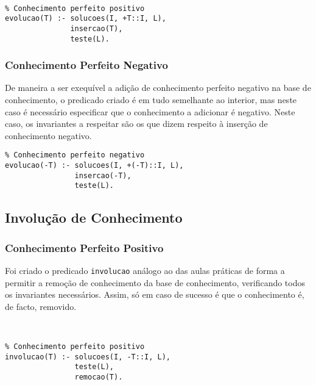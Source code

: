 \

\begin{lstlisting}[caption={Evolução de Conhecimento Perfeito Positivo}]
% Extensao do meta-predicado evolucao: T -> {V, F}
% Conhecimento perfeito positivo
evolucao(T) :- solucoes(I, +T::I, L),
               insercao(T),
               teste(L).
\end{lstlisting}

\subsubsection{Conhecimento Perfeito Negativo}

De maneira a ser exequível a adição de conhecimento perfeito negativo na
base de conhecimento, o predicado criado é em tudo semelhante ao interior, mas neste caso
é necessário especificar que o conhecimento a adicionar é negativo. Neste caso,
os invariantes a respeitar são os que dizem respeito à inserção de conhecimento
negativo.

\pagebreak

\begin{lstlisting}[caption={Evolução de Conhecimento Perfeito Negativo}]
% Extensao do meta-predicado evolucao: T -> {V, F}
% Conhecimento perfeito negativo
evolucao(-T) :- solucoes(I, +(-T)::I, L),
                insercao(-T),
                teste(L).
\end{lstlisting}

\subsection{Involução de Conhecimento}

\subsubsection{Conhecimento Perfeito Positivo}

Foi criado o predicado \texttt{involucao} análogo ao das aulas práticas de forma a permitir a 
remoção de conhecimento da base de conhecimento, verificando todos os invariantes necessários. 
Assim, só em caso de sucesso é que o conhecimento é, de facto, removido.

\

\begin{lstlisting}[caption={Involução de Conhecimento Perfeito Positivo}]
% Extensao do meta-predicado involucao: T -> {V, F}
% Conhecimento perfeito positivo
involucao(T) :- solucoes(I, -T::I, L),
                teste(L),
                remocao(T).
\end{lstlisting}

